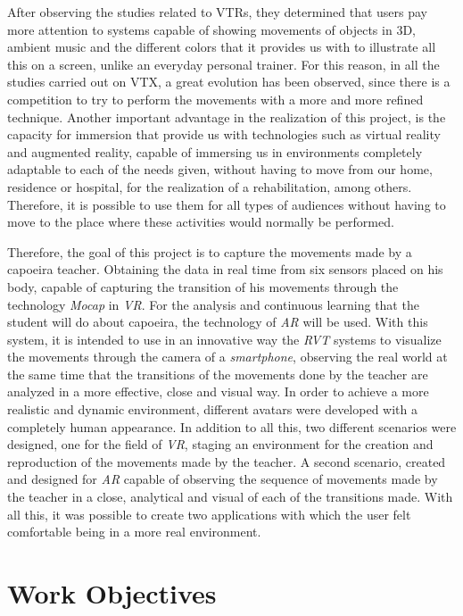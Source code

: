 After observing the studies related to VTRs, they determined that users pay more attention to systems capable of showing movements of objects in 3D, ambient music and the different colors that it provides us with to illustrate all this on a screen, unlike an everyday personal trainer. For this reason, in all the studies carried out on VTX, a great evolution has been observed, since there is a competition to try to perform the movements with a more and more refined technique. Another important advantage in the realization of this project, is the capacity for immersion that provide us with technologies such as virtual reality and augmented reality, capable of immersing us in environments completely adaptable to each of the needs given, without having to move from our home, residence or hospital, for the realization of a rehabilitation, among others. Therefore, it is possible to use them for all types of audiences without having to move to the place where these activities would normally be performed.

Therefore, the goal of this project is to capture the movements made by a capoeira teacher. Obtaining the data in real time from six sensors placed on his body, capable of capturing the transition of his movements through the technology \textit{Mocap} in \textit{VR}. For the analysis and continuous learning that the student will do about capoeira, the technology of \textit{AR} will be used. With this system, it is intended to use in an innovative way the \textit{RVT} systems to visualize the movements through the camera of a \textit{smartphone}, observing the real world at the same time that the transitions of the movements done by the teacher are analyzed in a more effective, close and visual way. In order to achieve a more realistic and dynamic environment, different avatars were developed with a completely human appearance. In addition to all this, two different scenarios were designed, one for the field of \textit{VR}, staging an environment for the creation and reproduction of the movements made by the teacher. A second scenario, created and designed for \textit{AR} capable of observing the sequence of movements made by the teacher in a close, analytical and visual of each of the transitions made. With all this, it was possible to create two applications with which the user felt comfortable being in a more real environment.


\section{Work Objectives}

